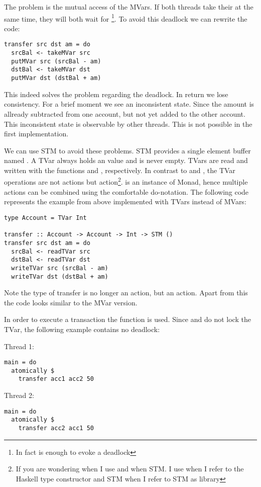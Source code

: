 The problem is the mutual access of the MVars. If both threads take their  at the same time, they will both wait for 
\footnote{In fact is  enough to evoke a deadlock}. To avoid this deadlock we can rewrite the code:
\begin{lstlisting}
transfer src dst am = do
  srcBal <- takeMVar src
  putMVar src (srcBal - am)
  dstBal <- takeMVar dst
  putMVar dst (dstBal + am)
\end{lstlisting}
This indeed solves the problem regarding the deadlock. In return we lose consistency. For a brief moment we see an inconsistent state. Since
the amount is allready subtracted from one account, but not yet added to the other account. This inconsistent state is observable by other 
threads. This is not possible in the first implementation. 

We can use STM to avoid these problems. STM provides a single element buffer named . A TVar always holds an value and is never 
empty. TVars are read and written with the functions  and , respectively. 
In contrast to  and , the TVar operations are not  actions but  action\footnote{If 
you are wondering when I use  and when STM. I use  when I refer to the Haskell type constructor and STM when I refer to STM as library}. 
 is an instance of Monad, hence multiple  actions can be combined
using the comfortable do-notation. The following code represents the example from above implemented with TVars instead of MVars:
\begin{lstlisting}
type Account = TVar Int

transfer :: Account -> Account -> Int -> STM ()
transfer src dst am = do
  srcBal <- readTVar src
  dstBal <- readTVar dst
  writeTVar src (srcBal - am)
  writeTVar dst (dstBal + am)
\end{lstlisting}
Note the type of transfer is no longer an  action, but an  action. Apart from this the code looks
similar to the MVar version.

In order to execute a transaction the function  is used. 
Since  and  do not lock the TVar, the following example contains no deadlock:
\par\noindent
\begin{minipage}[t]{.45\textwidth}
Thread 1:
\begin{lstlisting}[frame=lrtb]
main = do
  atomically $
    transfer acc1 acc2 50
\end{lstlisting}
\end{minipage}
\hfill
\begin{minipage}[t]{.45\textwidth}
Thread 2:
\begin{lstlisting}[frame=lrtb]
main = do 
  atomically $ 
    transfer acc2 acc1 50
\end{lstlisting}
\end{minipage}

